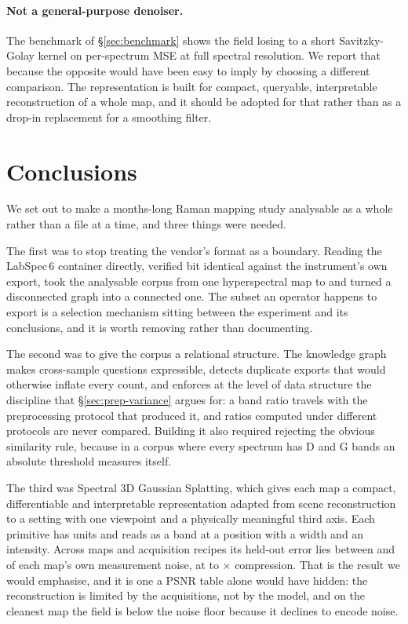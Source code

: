 \paragraph{Not a general-purpose denoiser.}
The benchmark of \S\ref{sec:benchmark} shows the field losing to a short
Savitzky-Golay kernel on per-spectrum MSE at full spectral resolution. We
report that because the opposite would have been easy to imply by choosing a
different comparison. The representation is built for compact, queryable,
interpretable reconstruction of a whole map, and it should be adopted for that
rather than as a drop-in replacement for a smoothing filter.


\section{Conclusions}
\label{sec:conclusions}

We set out to make a months-long Raman mapping study analysable as a whole
rather than a file at a time, and three things were needed.

The first was to stop treating the vendor's format as a boundary. Reading the
LabSpec\,6 container directly, verified bit identical against the instrument's
own export, took the analysable corpus from one hyperspectral map to
\Nrawmap{} and turned a disconnected graph into a connected one. The subset an
operator happens to export is a selection mechanism sitting between the
experiment and its conclusions, and it is worth removing rather than
documenting.

The second was to give the corpus a relational structure. The knowledge graph
makes cross-sample questions expressible, detects duplicate exports that would
otherwise inflate every count, and enforces at the level of data structure the
discipline that \S\ref{sec:prep-variance} argues for: a band ratio travels with
the preprocessing protocol that produced it, and ratios computed under
different protocols are never compared. Building it also required rejecting the
obvious similarity rule, because in a corpus where every spectrum has D and G
bands an absolute threshold measures itself.

The third was Spectral 3D Gaussian Splatting, which gives each map a compact,
differentiable and interpretable representation adapted from scene
reconstruction to a setting with one viewpoint and a physically meaningful
third axis. Each primitive has units and reads as a band at a position with a
width and an intensity. Across \SplatNfits{} maps and acquisition recipes its
held-out error lies between \SplatResidNoiseMin{} and \SplatResidNoiseMax{} of
each map's own measurement noise, at \SplatComprMin{} to
\SplatComprMax$\times$ compression. That is the result we would emphasise, and
it is one a PSNR table alone would have hidden: the reconstruction is limited
by the acquisitions, not by the model, and on the cleanest map the field is
below the noise floor because it declines to encode noise.

